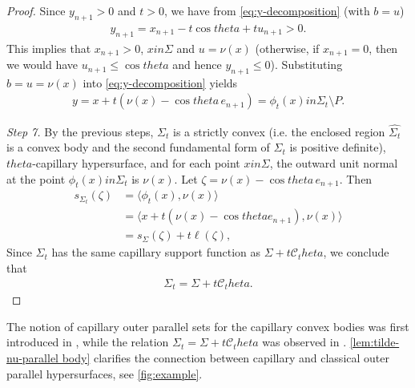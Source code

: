 \documentclass[12pt]{amsart}
\def\theta{theta}%
\def\in{in }%
\numberwithin{equation}{section}
\newcommand{\wh}{\widehat}
\newcommand{\8}{\infty}
\newcommand{\Si}{\Sigma}
\newcommand{\cC}{\mathcal{C}}
\newcommand{\eq}[1]{\begin{equation}\begin{alignedat}{2}#1\end{alignedat}\end{equation}}
\newcommand{\Cth}{\cC_\theta}
\begin{document}
\begin{proof}
Since $y_{n+1}>0$ and $t>0$, we have from \eqref{eq:y-decomposition} (with $b=u$)
\eq{
  y_{n+1}=x_{n+1}-t\cos\theta+tu_{n+1}>0.
}
This implies that $x_{n+1}>0$, $x\in \Si$ and $u=\nu(x)$ (otherwise, if $x_{n+1}=0$, then we would have $u_{n+1}\le \cos\theta$ and hence $y_{n+1}\le 0$).
Substituting $b=u=\nu(x)$ into \eqref{eq:y-decomposition} yields
\eq{
  y=x+t(\nu(x)-\cos\theta\,e_{n+1})=\phi_t(x)\in\Sigma_t\setminus P.
}

\emph{Step 7.} By the previous steps, $\Si_t$ is a strictly convex (i.e. the enclosed region $\wh{\Si_t}$ is a convex body and the second fundamental form of $\Si_t$ is positive definite), $\theta$-capillary hypersurface, and for each point $x\in \Sigma$, the outward unit normal at the point $\phi_t(x)\in\Sigma_t$ is $\nu(x)$. Let $\zeta=\nu(x)-\cos\theta\, e_{n+1}$. Then
\eq{
s_{\Sigma_t}(\zeta)&=\langle \phi_t(x),\nu(x)\rangle\\
&=\langle x+t(\nu(x)-\cos\theta e_{n+1}),\nu(x)\rangle\\
&=s_{\Sigma}(\zeta)+t\ell(\zeta),
}
Since $\Sigma_t$ has the same capillary support function as $\Sigma+t\Cth$, we conclude that
\eq{
  \Sigma_t=\Sigma+t\Cth.
}
\end{proof}
\begin{rem}
The notion of capillary outer parallel sets for the capillary convex bodies was first introduced in \cite{MWW25c}, while the relation $\Sigma_t=\Sigma+t\Cth$ was observed in \cite[Rem. 2.17]{MWWX25}. \autoref{lem:tilde-nu-parallel body} clarifies the connection between capillary and classical outer parallel hypersurfaces, see \autoref{fig:example}.
\end{rem}
\end{document}

